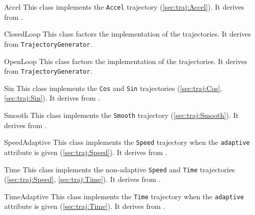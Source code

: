 \begin{urbiscriptapi}
\item[Accel] This class implements the \lstinline|Accel| trajectory
  (\autoref{sec:traj:Accel}).  It derives from
  .

\item[ClosedLoop] This class factors the implementation of the
   trajectories.  It derives from
  \lstinline|TrajectoryGenerator|.

\item[OpenLoop] This class factors the implementation of the 
  trajectories.  It derives from \lstinline|TrajectoryGenerator|.

\item[Sin] This class implements the \lstinline|Cos| and \lstinline|Sin|
  trajectories (\autoref{sec:traj:Cos}, \autoref{sec:traj:Sin}).  It derives
  from .

\item[Smooth] This class implements the \lstinline|Smooth| trajectory
  (\autoref{sec:traj:Smooth}).  It derives from
  .

\item[SpeedAdaptive] This class implements the \lstinline|Speed| trajectory
  when the \lstinline|adaptive| attribute is given
  (\autoref{sec:traj:Speed}).  It derives from
  .

\item[Time] This class implements the non-adaptive \lstinline|Speed| and
  \lstinline|Time| trajectories (\autoref{sec:traj:Speed},
  \autoref{sec:traj:Time}).  It derives from
  .

\item[TimeAdaptive] This class implements the \lstinline|Time| trajectory
  when the \lstinline|adaptive| attribute is given
  (\autoref{sec:traj:Time}).  It derives from
  .
\end{urbiscriptapi}

